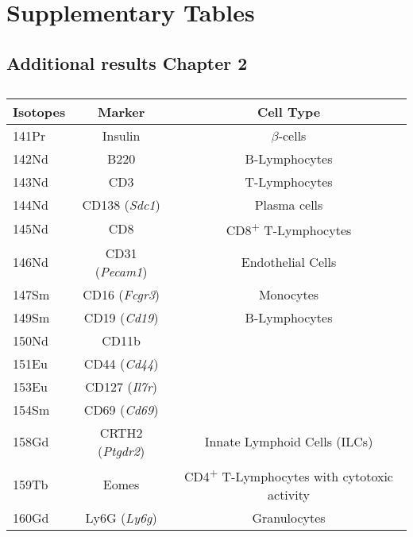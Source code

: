 \chapter{Supplementary Tables} 
\clearpage

\section{Additional results Chapter 2}


\begin{table}[ht!]
  \renewcommand{\arraystretch}{1.2} %
  \centering
  \begin{tabularx}{\textwidth}{|G|C|C|}
    \hline
    \textbf{Isotopes} & \textbf{Marker} & \textbf{Cell Type} \\
    \hline
    141Pr & Insulin & $\beta$-cells \\
    \hline
    142Nd & B220 & B-Lymphocytes \\
    \hline
    143Nd & CD3 & T-Lymphocytes \\
    \hline
    144Nd & CD138 (\textit{Sdc1}) & Plasma cells \\
    \hline
    145Nd & CD8 & CD8\textsuperscript{+} T-Lymphocytes \\
    \hline
    146Nd & CD31 (\textit{Pecam1}) & Endothelial Cells \\
    \hline
    147Sm & CD16 (\textit{Fcgr3}) & Monocytes \\
    \hline
    149Sm & CD19 (\textit{Cd19}) & B-Lymphocytes \\
    \hline
    150Nd & CD11b &  \\
    \hline
    151Eu & CD44 (\textit{Cd44}) &  \\
    \hline
    153Eu & CD127 (\textit{Il7r}) &  \\
    \hline
    154Sm & CD69 (\textit{Cd69}) &  \\
    \hline
    158Gd & CRTH2 (\textit{Ptgdr2}) & Innate Lymphoid Cells (ILCs) \\
    \hline
    159Tb & Eomes & CD4\textsuperscript{+} T-Lymphocytes with cytotoxic activity \\
    \hline
    160Gd & Ly6G (\textit{Ly6g}) & Granulocytes \\
    \hline
  \end{tabularx}
  \caption[]{}
  \label{}
\end{table}


